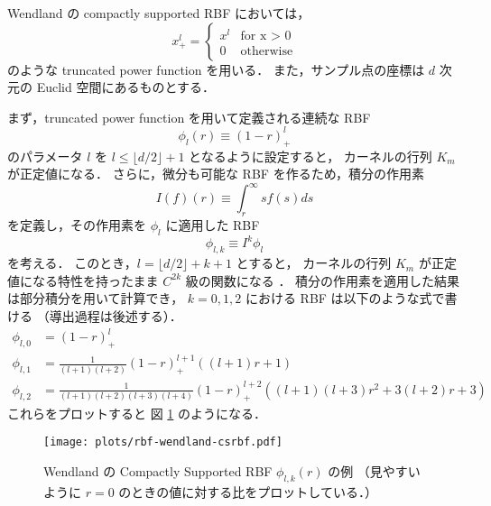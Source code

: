 Wendland の compactly supported RBF においては，
\begin{equation}
    x_+^l = \begin{cases}
        x^l & \text{for x > 0} \\
        0   & \text{otherwise}
    \end{cases}
\end{equation}
のような truncated power function を用いる．
また，サンプル点の座標は $d$ 次元の Euclid 空間にあるものとする．

まず，truncated power function を用いて定義される連続な RBF
\begin{equation}
    \phi_l(r) \equiv (1 - r)_+^l
\end{equation}
のパラメータ $l$ を $l \le \lfloor d/2 \rfloor + 1$ となるように設定すると，
カーネルの行列 $K_m$ が正定値になる．
さらに，微分も可能な RBF を作るため，積分の作用素
\begin{equation}
    I(f)(r) \equiv \int_r^\infty sf(s) ds
\end{equation}
を定義し，その作用素を $\phi_l$ に適用した RBF
\begin{equation}
    \phi_{l,k} \equiv I^k \phi_l \label{eq:rbf_wendland-csrbf_definition}
\end{equation}
を考える．
このとき，$l = \lfloor d/2 \rfloor + k + 1$ とすると，
カーネルの行列 $K_m$ が正定値になる特性を持ったまま
$C^{2k}$ 級の関数になる \cite[Theorem 3.5]{Wendland1995}．
積分の作用素を適用した結果は部分積分を用いて計算でき，
$k = 0, 1, 2$ における RBF は以下のような式で書ける
（導出過程は後述する）．
\begin{align}
    \phi_{l,0} & = (1 - r)_+^l
    \label{eq:rbf_wendland-csrbf_formula0}                                        \\
    \phi_{l,1} & = \frac{1}{(l+1)(l+2)} (1 - r)_+^{l+1} \left( (l+1)r + 1 \right)
    \label{eq:rbf_wendland-csrbf_formula1}                                        \\
    \phi_{l,2} & = \frac{1}{(l+1)(l+2)(l+3)(l+4)} (1 - r)_+^{l+2}
    \left( (l+1)(l+3)r^2 + 3(l+2)r + 3 \right)
    \label{eq:rbf_wendland-csrbf_formula2}
\end{align}
これらをプロットすると
図 \ref{fig:rbf_wendland-csrbf}
のようになる．

\begin{figure}[tp]
    \centering
    \texttt{[image: plots/rbf-wendland-csrbf.pdf]}
    \caption{Wendland の Compactly Supported RBF $\phi_{l,k}(r)$ \cite{Wendland1995} の例%
        （見やすいように $r = 0$ のときの値に対する比をプロットしている．）}
    \label{fig:rbf_wendland-csrbf}
\end{figure}

